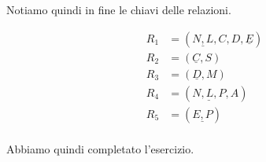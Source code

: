 \begin{exmp}
    Notiamo quindi in fine le chiavi delle relazioni.

    \begin{equation}
        \begin{split}
            R_1 & = ( \underline{N,L},C,D,\underline{E}) \\
            R_2 & = (\underline{C}, S ) \\
            R_3 & = (\underline{D}, M) \\
            R_4 & = (\underline{N,L,P},A ) \\
            R_5 & = (\underline{E,P})\\
        \end{split}
    \end{equation}

    Abbiamo quindi completato l'esercizio.
\end{exmp}